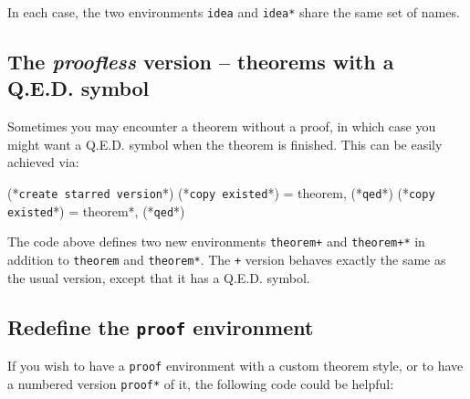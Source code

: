 \documentclass[classical]{einfart}
\newcommand{\commandoption}[1]{\texttt{\textcolor{code-keys}{#1}}}
\begin{document}
\begin{code}
\CreateTheorem{idea}{(*\commandoption{create starred version}*)}
\CreateTheorem{idea}{(*\commandoption{copy existed}*) = idea*}
\end{code}

\smallskip
In each case, the two environments {\normalfont\texttt{idea}} and {\normalfont\texttt{idea*}} share the same set of names.

\subsection{The \emph{proofless} version -- theorems with a Q.E.D. symbol}

Sometimes you may encounter a theorem without a proof, in which case you might want a Q.E.D. symbol when the theorem is finished. This can be easily achieved via:

\begin{code}
 { (*\commandoption{create starred version}*) }
 { (*\commandoption{copy existed}*) = theorem, (*\commandoption{qed}*) }
 { (*\commandoption{copy existed}*) = theorem*, (*\commandoption{qed}*) }
\end{code}

The code above defines two new environments \lstinline|theorem+| and \lstinline|theorem+*| in addition to \lstinline|theorem| and \lstinline|theorem*|. The \lstinline|+| version behaves exactly the same as the usual version, except that it has a Q.E.D. symbol.

\subsection{Redefine the {\normalfont\texttt{proof}} environment}

If you wish to have a {\normalfont\texttt{proof}} environment with a custom theorem style, or to have a numbered version {\normalfont\texttt{proof*}} of it, the following code could be helpful:
\end{document}
